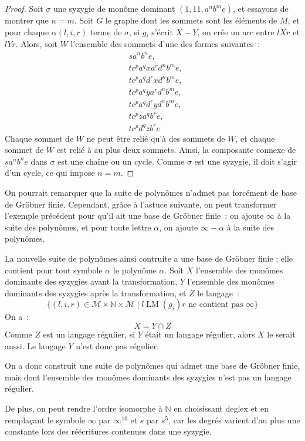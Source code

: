 \documentclass{article}
\newcommand{\N}{\mathbb{N}}
\newcommand{\M}{\mathcal{M}}
\DeclareMathOperator{\LM}{LM}
\begin{document}
\begin{proof}
Soit $\sigma$ une syzygie de monôme dominant $(1, 11, a^{n}b^{m}e)$, et essayons de montrer que $n = m$.
Soit $G$ le graphe dont les sommets sont les éléments de $M$, et pour chaque $\alpha(l, i, r)$ terme de $\sigma$, si $g_i$ s'écrit $X - Y$, on crée un arc entre $lXr$ et $lYr$.
Alors, soit $W$ l'ensemble des sommets d'une des formes suivantes~:
\begin{align*}
& sa^nb^ne, \\
& tc^pa^qxa^rd^nb^me, \\
& tc^pa^qd^rxd^nb^me, \\
& tc^pa^qya^rd^nb^me, \\
& tc^pa^qd^ryd^nb^me, \\
& tc^pza^qb^re, \\
& tc^pd^qzb^re
\end{align*}
Chaque sommet de $W$ ne peut être relié qu'à des sommets de $W$, et chaque sommet de $W$ est relié à au plus deux sommets. Ainsi, la composante connexe de $sa^nb^ne$ dans $\sigma$ est une chaîne ou un cycle. Comme $\sigma$ est une syzygie, il doit s'agir d'un cycle, ce qui impose $n = m$.

\end{proof}

On pourrait remarquer que la suite de polynômes n'admet pas forcément de base de Gröbner finie.
Cependant, grâce à l'astuce suivante, on peut transformer l'exemple précédent pour qu'il ait une base de Gröbner finie~: on ajoute $\infty$ à la suite des polynômes, et pour toute lettre $\alpha$, on ajoute $\infty - \alpha$ à la suite des polynômes.

La nouvelle suite de polynômes ainsi contruite a une base de Gröbner finie ; elle contient pour tout symbole $\alpha$ le polynôme $\alpha$.
Soit $X$ l'ensemble des monômes dominants des syzygies avant la transformation, $Y$ l'ensemble des monômes dominants des syzygies après la transformation, et $Z$ le langage~:
$$\{(l, i, r) \in \M \times \N \times \M \;|\; l \LM(g_i) r \mbox{ ne contient pas } \infty\}$$
On a~:
$$X = Y \cap Z$$
Comme $Z$ est un langage régulier, si $Y$ était un langage régulier, alors $X$ le serait aussi.
Le langage $Y$ n'est donc pas régulier.

On a donc construit une suite de polynômes qui admet une base de Gröbner finie, mais dont l'ensemble des monômes dominants des syzygies n'est pas un langage régulier.

De plus, on peut rendre l'ordre isomorphe à $\N$ en choisissant deglex et en remplaçant le symbole $\infty$ par $\infty^{10}$ et $s$ par $s^5$, car les degrés varient d'au plus une constante lors des réécritures contenues dans une syzygie.
\end{document}
